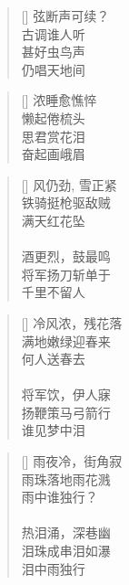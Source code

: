 \renewcommand{\poemtoc}{section}
\settowidth{\versewidth}{弦断声可续}
\begin{verse}[\versewidth]
弦断声可续？\\
古调谁人听\\
甚好虫鸟声\\
仍唱天地间
\end{verse}

\renewcommand{\poemtoc}{section}
\settowidth{\versewidth}{浓睡愈憔悴}
\begin{verse}[\versewidth]
浓睡愈憔悴\\
懒起倦梳头\\
思君赏花泪\\
奋起画峨眉
\end{verse}

\renewcommand{\poemtoc}{section}
\settowidth{\versewidth}{风仍劲, 雪正紧}
\begin{verse}[\versewidth]
风仍劲, 雪正紧\\
铁骑挺枪驱敌贼\\
满天红花坠\\
~\\
酒更烈，鼓最鸣\\
将军扬刀斩单于\\
千里不留人
\end{verse}

\renewcommand{\poemtoc}{section}
\settowidth{\versewidth}{风仍劲, 雪正紧}
\begin{verse}[\versewidth]
冷风浓，残花落\\
满地嫩绿迎春来\\
何人送春去\\
~\\
将军饮，伊人寐\\
扬鞭策马弓箭行\\
谁见梦中泪
\end{verse}

\renewcommand{\poemtoc}{section}
\settowidth{\versewidth}{风仍劲, 雪正紧}
\begin{verse}[\versewidth]
雨夜冷，街角寂\\
雨珠落地雨花溅\\
雨中谁独行？\\
~\\
热泪涌，深巷幽\\
泪珠成串泪如瀑\\
泪中雨独行
\end{verse}
